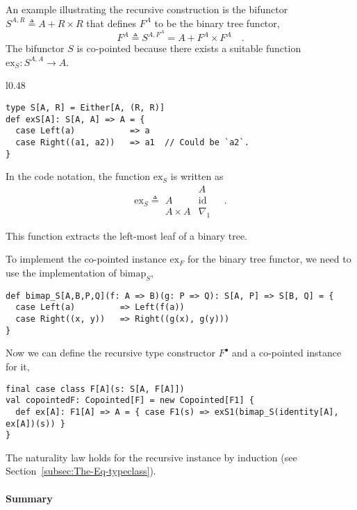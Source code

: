 An example illustrating the recursive construction is the bifunctor
$S^{A,R}\triangleq A+R\times R$ that defines $F^{A}$ to be the binary
tree functor, 
\[
F^{A}\triangleq S^{A,F^{A}}=A+F^{A}\times F^{A}\quad.
\]
The bifunctor $S$ is co-pointed because there exists a suitable function
$\text{ex}_{S}:S^{A,A}\rightarrow A$.

\begin{wrapfigure}{l}{0.48\columnwidth}%
\vspace{-0.35\baselineskip}
\begin{lstlisting}
type S[A, R] = Either[A, (R, R)]
def exS[A]: S[A, A] => A = {
  case Left(a)           => a
  case Right((a1, a2))   => a1  // Could be `a2`.
}
\end{lstlisting}

\vspace{-1.75\baselineskip}
\end{wrapfigure}%

\noindent In the code notation, the function $\text{ex}_{S}$ is written
as\vspace{-0.2\baselineskip}
\[
\text{ex}_{S}\triangleq\begin{array}{|c||c|}
 & A\\
\hline A & \text{id}\\
A\times A & \nabla_{1}
\end{array}\quad.
\]

\noindent This function extracts the left-most leaf of a binary tree.

To implement the co-pointed instance $\text{ex}_{F}$ for the binary
tree functor, we need to use the implementation of $\text{bimap}_{S}$,
\begin{lstlisting}
def bimap_S[A,B,P,Q](f: A => B)(g: P => Q): S[A, P] => S[B, Q] = {
  case Left(a)         => Left(f(a))
  case Right((x, y))   => Right((g(x), g(y)))
}
\end{lstlisting}
Now we can define the recursive type constructor $F^{\bullet}$ and
a co-pointed instance for it,
\begin{lstlisting}
final case class F[A](s: S[A, F[A]])
val copointedF: Copointed[F] = new Copointed[F1] {
  def ex[A]: F1[A] => A = { case F1(s) => exS1(bimap_S(identity[A], ex[A])(s)) }
}
\end{lstlisting}

The naturality law holds for the recursive instance by induction (see
Section~\ref{subsec:The-Eq-typeclass}).

\paragraph{Summary}

